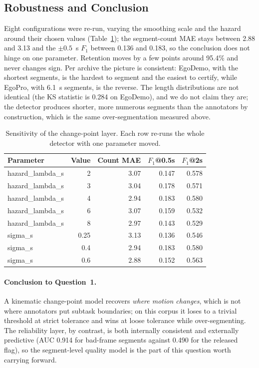 \documentclass{swmcmthesis}
\begin{document}
\subsection{Robustness and Conclusion}
Eight configurations were re-run, varying the smoothing scale and the hazard around their chosen values (Table~\ref{tab:p1sens}); the segment-count MAE stays between 2.88 and 3.13 and the $\pm0.5$~s $F_1$ between 0.136 and 0.183, so the conclusion does not hinge on one parameter. Retention moves by a few points around 95.4\% and never changes sign. Per archive the picture is consistent: EgoDemo, with the shortest segments, is the hardest to segment and the easiest to certify, while EgoPro, with 6.1~s segments, is the reverse. The length distributions are not identical (the KS statistic is 0.284 on EgoDemo), and we do not claim they are; the detector produces shorter, more numerous segments than the annotators by construction, which is the same over-segmentation measured above.

\begin{table}[tbp]\centering\footnotesize
\caption{Sensitivity of the change-point layer. Each row re-runs the whole detector with one parameter moved.}\label{tab:p1sens}
\begin{tabular}{lrrrr}
\toprule
Parameter & Value & Count MAE & $F_1$@0.5s & $F_1$@2s \\
\midrule
hazard\_lambda\_s & 2 & 3.07 & 0.147 & 0.578 \\
hazard\_lambda\_s & 3 & 3.04 & 0.178 & 0.571 \\
hazard\_lambda\_s & 4 & 2.94 & 0.183 & 0.580 \\
hazard\_lambda\_s & 6 & 3.07 & 0.159 & 0.532 \\
hazard\_lambda\_s & 8 & 2.97 & 0.143 & 0.529 \\
sigma\_s & 0.25 & 3.13 & 0.136 & 0.546 \\
sigma\_s & 0.4 & 2.94 & 0.183 & 0.580 \\
sigma\_s & 0.6 & 2.88 & 0.152 & 0.563 \\
\bottomrule
\end{tabular}
\end{table}

\paragraph{Conclusion to Question~1.} A kinematic change-point model recovers \emph{where motion changes}, which is not where annotators put subtask boundaries; on this corpus it loses to a trivial threshold at strict tolerance and wins at loose tolerance while over-segmenting. The reliability layer, by contrast, is both internally consistent and externally predictive (AUC 0.914 for bad-frame segments against 0.490 for the released flag), so the segment-level quality model is the part of this question worth carrying forward.
\end{document}

